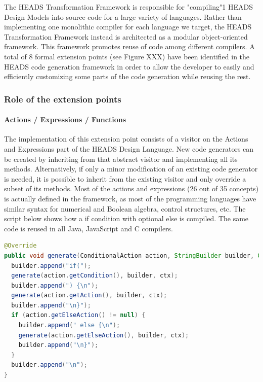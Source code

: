 The HEADS Transformation Framework is responsible for "compiling"1  HEADS Design Models into source code for a large variety of languages. Rather than implementing one monolithic compiler for each language we target, the HEADS Transformation Framework instead is architected as a modular object-oriented framework. This framework promotes reuse of code among different compilers. A total of 8 formal extension points (see Figure XXX) have been identified in the HEADS code generation framework in order to allow the developer to easily and efficiently customizing some parts of the code generation while reusing the rest. 

\subsubsection{Role of the extension points}

\paragraph{Actions / Expressions / Functions }


The implementation of this extension point consists of a visitor on the Actions and Expressions part of the HEADS Design Language. New code generators can be created by inheriting from that abstract visitor and implementing all its methods. Alternatively, if only a minor modification of an existing code generator is needed, it is possible to inherit from the existing visitor and only override a subset of its methods. Most of the actions and expressions (26 out of 35 concepts) is actually defined in the framework, as most of the programming languages have similar syntax for numerical and Boolean algebra, control structures, etc. The script below shows how a if  condition with optional else is compiled. The same code is reused in all Java, JavaScript and C compilers. 

\begin{lstlisting}[language=Java]
@Override 
public void generate(ConditionalAction action, StringBuilder builder, Context ctx) { 
  builder.append("if("); 
  generate(action.getCondition(), builder, ctx); 
  builder.append(") {\n"); 
  generate(action.getAction(), builder, ctx); 
  builder.append("\n}"); 
  if (action.getElseAction() != null) { 
    builder.append(" else {\n"); 
    generate(action.getElseAction(), builder, ctx); 
    builder.append("\n}"); 
  } 
  builder.append("\n"); 
} 
\end{lstlisting}

